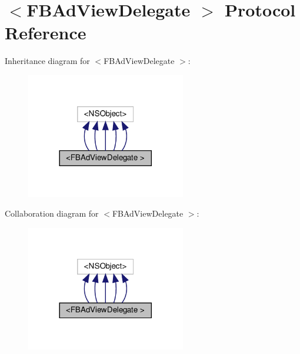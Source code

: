 \hypertarget{protocolFBAdViewDelegate_01-p}{}\section{$<$F\+B\+Ad\+View\+Delegate $>$ Protocol Reference}
\label{protocolFBAdViewDelegate_01-p}


Inheritance diagram for $<$F\+B\+Ad\+View\+Delegate $>$\+:
\nopagebreak
\begin{figure}[H]
\begin{center}
\leavevmode
\includegraphics[width=197pt]{protocolFBAdViewDelegate_01-p__inherit__graph}
\end{center}
\end{figure}


Collaboration diagram for $<$F\+B\+Ad\+View\+Delegate $>$\+:
\nopagebreak
\begin{figure}[H]
\begin{center}
\leavevmode
\includegraphics[width=197pt]{protocolFBAdViewDelegate_01-p__coll__graph}
\end{center}
\end{figure}

